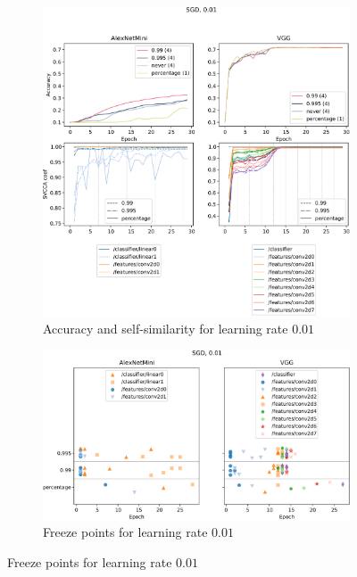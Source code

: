 \begin{figure}
    \centering
    \caption{Layer convergence experiment with learning rate $0.01$}
    \label{fig:saturation_alexnet_vgg_sgd_001}
    \begin{subfigure}{\textwidth}
        \includegraphics[width=\linewidth]{gfx/diagrams/experiments/saturation/acc_sim_alexnetmini_vgg_sgd_001.pdf}
        \caption{Accuracy and self-similarity for learning rate $0.01$}
        \label{fig:saturation_alexnet_vgg_sgd_001_similarity}
    \end{subfigure}

    \begin{subfigure}{\textwidth}
        \includegraphics[width=\linewidth]{gfx/diagrams/experiments/saturation/convergence_alexnetmini_vgg_sgd_001.pdf}
        \caption{Freeze points for learning rate $0.01$}
        \label{fig:saturation_alexnet_vgg_sgd_001_convergence}
    \end{subfigure}
\end{figure}


